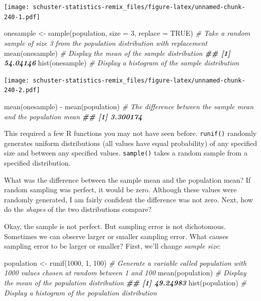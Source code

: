 \documentclass[
]{book}
\newenvironment{Shaded}{\begin{snugshade}}{\end{snugshade}}
\newcommand{\AttributeTok}[1]{\textcolor[rgb]{0.77,0.63,0.00}{#1}}
\newcommand{\CommentTok}[1]{\textcolor[rgb]{0.56,0.35,0.01}{\textit{#1}}}
\newcommand{\ConstantTok}[1]{\textcolor[rgb]{0.00,0.00,0.00}{#1}}
\newcommand{\DecValTok}[1]{\textcolor[rgb]{0.00,0.00,0.81}{#1}}
\newcommand{\DocumentationTok}[1]{\textcolor[rgb]{0.56,0.35,0.01}{\textbf{\textit{#1}}}}
\newcommand{\FunctionTok}[1]{\textcolor[rgb]{0.00,0.00,0.00}{#1}}
\newcommand{\NormalTok}[1]{#1}
\newcommand{\OtherTok}[1]{\textcolor[rgb]{0.56,0.35,0.01}{#1}}
\newcommand{\SpecialCharTok}[1]{\textcolor[rgb]{0.00,0.00,0.00}{#1}}
\begin{document}
\texttt{[image: schuster-statistics-remix\_files/figure-latex/unnamed-chunk-240-1.pdf]}

\begin{Shaded}
\begin{Highlighting}[]
\NormalTok{onesample }\OtherTok{\textless{}{-}} \FunctionTok{sample}\NormalTok{(population, }\AttributeTok{size =} \DecValTok{3}\NormalTok{, }\AttributeTok{replace =} \ConstantTok{TRUE}\NormalTok{) }\CommentTok{\# Take a random sample of size 3 from the population distribution with replacement}
\FunctionTok{mean}\NormalTok{(onesample) }\CommentTok{\# Display the mean of the sample distribution}
\DocumentationTok{\#\# [1] 54.04146}
\FunctionTok{hist}\NormalTok{(onesample) }\CommentTok{\# Display a histogram of the sample distribution}
\end{Highlighting}
\end{Shaded}

\texttt{[image: schuster-statistics-remix\_files/figure-latex/unnamed-chunk-240-2.pdf]}

\begin{Shaded}
\begin{Highlighting}[]
\FunctionTok{mean}\NormalTok{(onesample) }\SpecialCharTok{{-}} \FunctionTok{mean}\NormalTok{(population) }\CommentTok{\# The difference between the sample mean and the population mean}
\DocumentationTok{\#\# [1] 3.300174}
\end{Highlighting}
\end{Shaded}

This required a few R functions you may not have seen before. \texttt{runif()} randomly generates uniform distributions (all values have equal probability) of any specified size and between any specified values. \texttt{sample()} takes a random sample from a specified distribution.

What was the difference between the sample mean and the population mean? If random sampling was perfect, it would be zero. Although these values were randomly generated, I am fairly confident the difference was not zero. Next, how do the \emph{shapes} of the two distributions compare?

Okay, the sample is not perfect. But sampling error is not dichotomous. Sometimes we can observe larger or smaller sampling error. What causes sampling error to be larger or smaller? First, we'll change \emph{sample size}:

\begin{Shaded}
\begin{Highlighting}[]
\NormalTok{population }\OtherTok{\textless{}{-}} \FunctionTok{runif}\NormalTok{(}\DecValTok{1000}\NormalTok{, }\DecValTok{1}\NormalTok{, }\DecValTok{100}\NormalTok{) }\CommentTok{\# Generate a variable called \textquotesingle{}population\textquotesingle{} with 1000 values chosen at random between 1 and 100}
\FunctionTok{mean}\NormalTok{(population) }\CommentTok{\# Display the mean of the population distribution}
\DocumentationTok{\#\# [1] 49.24983}
\FunctionTok{hist}\NormalTok{(population) }\CommentTok{\# Display a histogram of the population distribution}
\end{Highlighting}
\end{Shaded}
\end{document}

